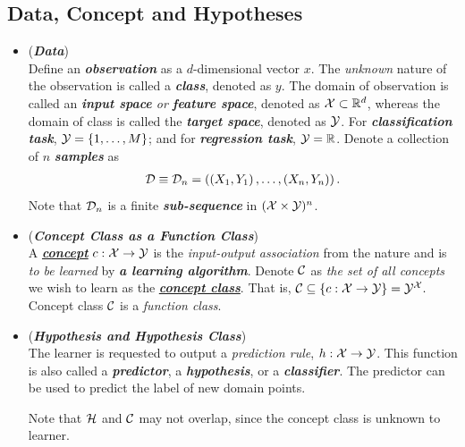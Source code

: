 \documentclass[11pt]{article}
\begin{document}
\subsection{Data, Concept and Hypotheses}
\begin{itemize}
\item \begin{remark} (\emph{\textbf{Data}})\\
Define an \emph{\textbf{observation}} as a $d$-dimensional vector $x$. The \emph{unknown} nature of the observation is called a \emph{\textbf{class}}, denoted as $y$. The domain of observation is called an \emph{\textbf{input space} or \textbf{feature space}}, denoted as ${\mathcal X}\subset {\mathbb R}^{d}$, whereas the domain of class is called the \emph{\textbf{target space}}, denoted as ${\mathcal Y}$. For \emph{\textbf{classification task}}, ${\mathcal Y}= \left\{1,\ldots, M\right\}$; and for \emph{\textbf{regression task}}, ${\mathcal Y} = {\mathbb R}$. 
Denote a collection of $n$ \emph{\textbf{samples}} as 
\begin{align*}
{\mathcal D} \equiv {\mathcal D}_n = \left((X_1, Y_1) \,{,}\ldots{,}\, (X_n, Y_n)\right).
\end{align*} Note that ${\mathcal D}_n$ is a finite \emph{\textbf{sub-sequence}} in $({\mathcal X} \times {\mathcal Y})^n$.
\end{remark}


\item \begin{definition} (\emph{\textbf{Concept Class as a Function Class}})\\
 A \underline{\emph{\textbf{concept}}} $c: {\mathcal X} \rightarrow {\mathcal Y}$ is the \emph{input-output association} from the nature and is \emph{to be learned} by \emph{\textbf{a learning algorithm}}.  Denote ${\mathcal C}$ as \emph{the set of all concepts} we wish to learn as the \underline{\emph{\textbf{concept class}}}. That is, ${\mathcal C} \subseteq \left\{c: {\mathcal X} \rightarrow {\mathcal Y} \right\} ={\mathcal Y}^{{\mathcal X}}.$ Concept class ${\mathcal C}$ is a \emph{function class}. 
\end{definition}

\item \begin{definition} (\emph{\textbf{Hypothesis and Hypothesis Class}})\\
The learner is requested to output a \emph{prediction rule}, $h : {\mathcal X} \to {\mathcal Y}$. This function is also called a \emph{\textbf{predictor}}, a \emph{\textbf{hypothesis}}, or a \emph{\textbf{classifier}}. The predictor can be used to predict the label of new domain points. 

Note that ${\mathcal H}$ and ${\mathcal C}$ may not overlap, since the concept class is unknown to learner. 
\end{definition}
\end{itemize}
\end{document}
